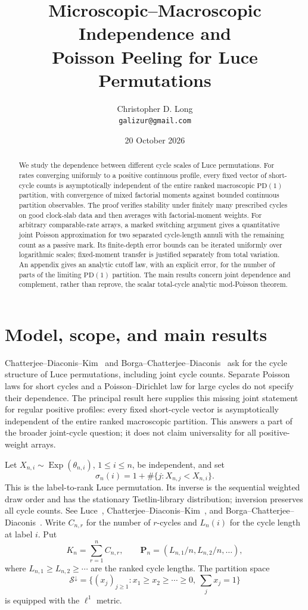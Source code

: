 \documentclass[11pt]{article}
\title{Microscopic--Macroscopic Independence and\\
Poisson Peeling for Luce Permutations}
\author{Christopher D. Long\\\texttt{galizur@gmail.com}}
\date{20 October 2026}
\numberwithin{equation}{section}
\theoremstyle{definition}
\theoremstyle{remark}
\begin{document}
\maketitle
\begin{abstract}
We study the dependence between different cycle scales of Luce permutations.
For rates converging uniformly to a positive continuous profile, every fixed
vector of short-cycle counts is asymptotically independent of the entire
ranked macroscopic $\mathrm{PD}(1)$ partition, with convergence of mixed
factorial moments against bounded continuous partition observables.
The proof verifies stability under finitely many prescribed cycles on good
clock-slab data and then averages with factorial-moment weights.
For arbitrary comparable-rate arrays, a marked switching argument gives a
quantitative joint Poisson approximation for two separated cycle-length
annuli with the remaining count as a passive mark.  Its finite-depth error
bounds can be iterated uniformly over logarithmic scales; fixed-moment
transfer is justified separately from total variation.
An appendix gives an analytic cutoff law, with an explicit error,
for the number of parts of the limiting $\mathrm{PD}(1)$ partition.
The main results concern joint dependence and complement, rather than
reprove, the scalar total-cycle analytic mod-Poisson theorem.
\end{abstract}
\setcounter{tocdepth}{1}
\tableofcontents
\newpage
\raggedbottom

\section{Model, scope, and main results}\label{sec:introduction}

Chatterjee--Diaconis--Kim~\cite[Introduction]{ChatterjeeDiaconisKim2023}
and Borga--Chatterjee--Diaconis~\cite[Section~5.2]{BorgaChatterjeeDiaconis2025}
ask for the cycle structure of Luce permutations, including joint cycle
counts.  Separate Poisson laws for short cycles and a Poisson--Dirichlet
law for large cycles do not specify their dependence.  The principal
result here supplies this missing joint statement for regular positive
profiles: every fixed short-cycle vector is asymptotically independent of
the entire ranked macroscopic partition.  This answers a part of the
broader joint-cycle question; it does not claim universality for all
positive-weight arrays.

Let $X_{n,i}\sim\operatorname{Exp}(\theta_{n,i})$, $1\le i\le n$, be
independent, and set
\[
 \sigma_n(i)=1+\#\{j:X_{n,j}<X_{n,i}\}.
\]
This is the label-to-rank Luce permutation.  Its inverse is the sequential
weighted draw order and has the stationary Tsetlin-library distribution;
inversion preserves all cycle counts.  See Luce~\cite{Luce1959},
Chatterjee--Diaconis--Kim~\cite{ChatterjeeDiaconisKim2023}, and
Borga--Chatterjee--Diaconis~\cite{BorgaChatterjeeDiaconis2025}.
Write $C_{n,r}$ for the number of $r$-cycles and $L_n(i)$ for the cycle
length at label $i$.  Put
\[
 K_n=\sum_{r=1}^nC_{n,r},\qquad
 \mathbf P_n=(L_{n,1}/n,L_{n,2}/n,\ldots),
\]
where $L_{n,1}\ge L_{n,2}\ge\cdots$ are the ranked cycle lengths.
The partition space
\[
 \mathcal S^\downarrow=
 \{(x_j)_{j\ge1}:x_1\ge x_2\ge\cdots\ge0,\ \sum_jx_j=1\}
\]
is equipped with the $\ell^1$ metric.
\end{document}
